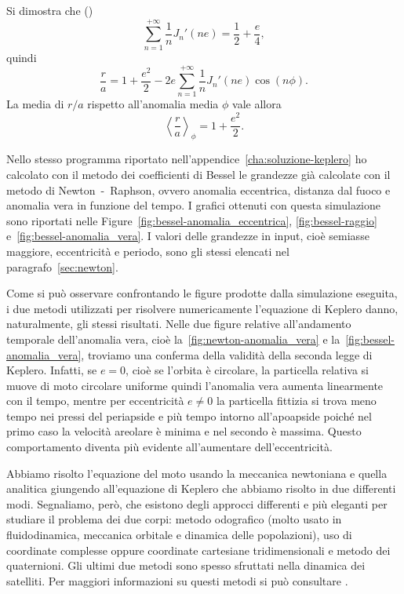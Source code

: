 Si dimostra che (\textcite[555]{watson:bessel})
\begin{equation}
  \sum_{n=1}^{+\infty}\frac{1}{n}J_n'(ne) = \frac{1}{2} + \frac{e}{4},
\end{equation}
quindi
\begin{equation}
  \label{eq:r-su-a-bessel}
  \frac{r}{a} = 1 + \frac{e^2}{2} - 2e \sum_{n=1}^{+\infty} \frac{1}{n} J_n'(ne)
  \cos(n\phi).
\end{equation}
La media di $r/a$ rispetto all'anomalia media $\phi$ vale allora
\begin{equation}
  \left\langle \frac{r}{a} \right\rangle_\phi = 1 + \frac{e^2}{2}.
\end{equation}

Nello stesso programma riportato nell'appendice~\ref{cha:soluzione-keplero} ho
calcolato con il metodo dei coefficienti di Bessel le grandezze già calcolate
con il metodo di Newton~-~Raphson, ovvero anomalia eccentrica, distanza dal
fuoco e anomalia vera in funzione del tempo. I grafici ottenuti con questa
simulazione sono riportati nelle Figure~\ref{fig:bessel-anomalia_eccentrica},
\ref{fig:bessel-raggio} e~\ref{fig:bessel-anomalia_vera}. I valori delle
grandezze in input, cioè semiasse maggiore, eccentricità e periodo, sono gli
stessi elencati nel paragrafo~\ref{sec:newton}.

Come si può osservare confrontando le figure prodotte dalla simulazione
eseguita, i due metodi utilizzati per risolvere numericamente l'equazione di
Keplero danno, naturalmente, gli stessi risultati. Nelle due figure relative
all'andamento temporale dell'anomalia vera, cioè
la~\ref{fig:newton-anomalia_vera} e la~\ref{fig:bessel-anomalia_vera}, troviamo
una conferma della validità della seconda legge di Keplero. Infatti, se $e=0$,
cioè se l'orbita è circolare, la particella relativa si muove di moto circolare
uniforme quindi l'anomalia vera aumenta linearmente con il tempo, mentre per
eccentricità $e\neq 0$ la particella fittizia si trova meno tempo nei pressi del
periapside e più tempo intorno all'apoapside poiché nel primo caso la velocità
areolare è minima e nel secondo è massima. Questo comportamento diventa più
evidente all'aumentare dell'eccentricità.

Abbiamo risolto l'equazione del moto usando la meccanica newtoniana e quella
analitica giungendo all'equazione di Keplero che abbiamo risolto in due
differenti modi. Segnaliamo, però, che esistono degli approcci differenti e più
eleganti per studiare il problema dei due corpi: metodo odografico (molto usato
in fluidodinamica, meccanica orbitale e dinamica delle popolazioni), uso di
coordinate complesse oppure coordinate cartesiane tridimensionali e metodo dei
quaternioni. Gli ultimi due metodi sono spesso sfruttati nella dinamica dei
satelliti. Per maggiori informazioni su questi metodi si può consultare
\textcite{tan:orbital-motion}.

